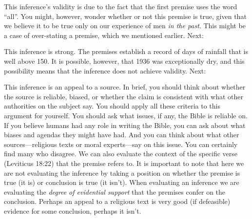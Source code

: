 This inference's validity is due to the fact that the first premise uses the word ``all''. You might, however, wonder whether or not this premise is true, given that we believe it to be true only on our experience of men \textit{in the past}. This might be a case of over-stating a premise, which we mentioned earlier. Next:

\begin{kormanize}
\end{kormanize}

This inference is strong. The premises establish a record of days of rainfall that is well above 150. It is possible, however, that 1936 was exceptionally dry, and this possibility means that the inference does not achieve validity. Next:

\begin{kormanize}
\end{kormanize}

This inference is an appeal to a source. In brief, you should think about whether the source is reliable, biased, or whether the claim is consistent with what other authorities on the subject say. You should apply all these criteria to this argument for yourself. You should ask what issues, if any, the Bible is reliable on. If you believe humans had any role in writing the Bible, you can ask about what biases and agendas they might have had. And you can think about what other sources---religious texts or moral experts---say on this issue. You can certainly find many who disagree. We can also evaluate the context of the specific verse (Leviticus 18:22) that the premise refers to. It is important to note that here we are not evaluating the inference by taking a position on whether the premise is true (it is) or conclusion is true (it isn't). When evaluating an inference we are evaluating the \emph{degree of evidential support} that the premises confer on the conclusion. Perhaps an appeal to a religious text is very good (if defeasible) evidence for some conclusion, perhaps it isn't.

\begin{kormanize}
\end{kormanize}

